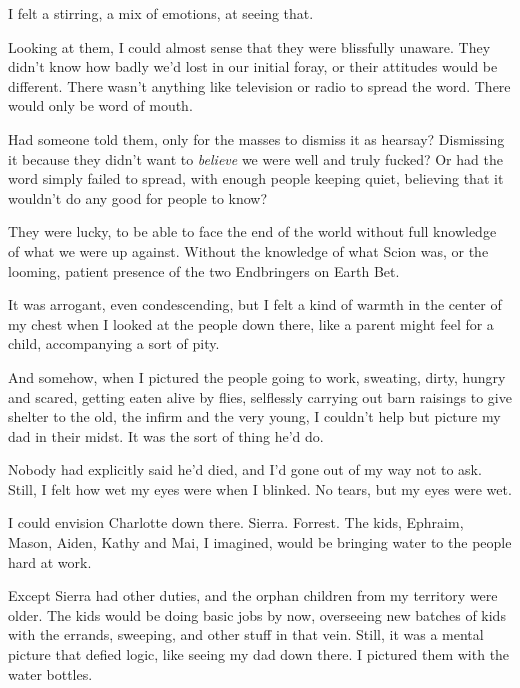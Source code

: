 I felt a stirring, a mix of emotions, at seeing that.



Looking at them, I could almost sense that they were blissfully unaware.  They didn't know how badly we'd lost in our initial foray, or their attitudes would be different.  There wasn't anything like television or radio to spread the word.  There would only be word of mouth.



Had someone told them, only for the masses to dismiss it as hearsay?  Dismissing it because they didn't want to \emph{believe} we were well and truly fucked?  Or had the word simply failed to spread, with enough people keeping quiet, believing that it wouldn't do any good for people to know?



They were lucky, to be able to face the end of the world without full knowledge of what we were up against.  Without the knowledge of what Scion was, or the looming, patient presence of the two Endbringers on Earth Bet.



It was arrogant, even condescending, but I felt a kind of warmth in the center of my chest when I looked at the people down there, like a parent might feel for a child, accompanying a sort of pity.



And somehow, when I pictured the people going to work, sweating, dirty, hungry and scared, getting eaten alive by flies, selflessly carrying out barn raisings to give shelter to the old, the infirm and the very young, I couldn't help but picture my dad in their midst.  It was the sort of thing he'd do.



Nobody had explicitly said he'd died, and I'd gone out of my way not to ask.  Still, I felt how wet my eyes were when I blinked.  No tears, but my eyes were wet.



I could envision Charlotte down there.  Sierra.  Forrest.  The kids, Ephraim, Mason, Aiden, Kathy and Mai, I imagined, would be bringing water to the people hard at work.



Except Sierra had other duties, and the orphan children from my territory were older.  The kids would be doing basic jobs by now, overseeing new batches of kids with the errands, sweeping, and other stuff in that vein.  Still, it was a mental picture that defied logic, like seeing my dad down there.  I pictured them with the water bottles.



